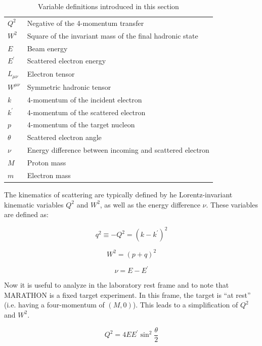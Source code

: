 \begin{table}
\center
\begin{tabular}{|l|l|}
\hline 
$Q^2$ & Negative of the 4-momentum transfer \\
$W^2$ & Square of the invariant mass of the final hadronic state \\
$E$ & Beam energy \\
$E^\prime$ & Scattered electron energy \\
$L_{\mu\nu}$ & Electron tensor \\
$W^{\mu\nu}$ & Symmetric hadronic tensor \\
$k$ & 4-momentum of the incident electron \\
$k^\prime$ & 4-momentum of the scattered electron \\
$p$ & 4-momentum of the target nucleon \\
$\theta$ & Scattered electron angle \\
$\nu$ & Energy difference between incoming and scattered electron \\
$M$ & Proton mass \\
$m$ & Electron mass \\
\hline
\end{tabular}
\caption{Variable definitions introduced in this section}
\label{tab:var_def}
\end{table}

The kinematics of scattering are typically defined by he Lorentz-invariant kinematic variables $Q^2$ and $W^2$, as well as the energy difference $\nu$. These variables are defined as:

\begin{equation}
	q^2 \equiv -Q^2 = \left(k-k^\prime\right)^2
\end{equation}

\begin{equation}
	W^2 = \left(p+q\right)^2
\end{equation}

\begin{equation}
	\nu = E-E^\prime
\end{equation}

Now it is useful to analyze in the laboratory rest frame and to note that MARATHON is a fixed target experiment. In this frame, the target is ``at rest'' (i.e. having a four-momentum of $\left(M,0\right)$). This leads to a simplification of $Q^2$ and $W^2$.

\begin{equation}
	Q^2 = 4EE^\prime\sin^2\frac{\theta}{2}
\end{equation}

